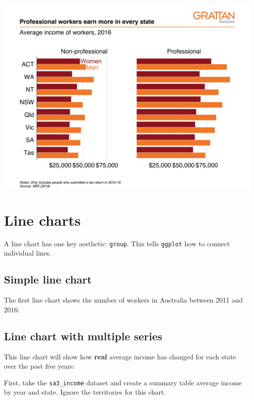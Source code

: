 \documentclass[
]{book}
\begin{document}
\includegraphics[width=44.44in]{atlas/facet_bar}

\hypertarget{line-charts}{%
\section{Line charts}\label{line-charts}}

A line chart has one key aesthetic: \texttt{group}. This tells \texttt{ggplot} how to connect individual lines.

\hypertarget{simple-line-chart}{%
\subsection{Simple line chart}\label{simple-line-chart}}

The first line chart shows the number of workers in Australia between 2011 and 2016:

\hypertarget{line-chart-with-multiple-series}{%
\subsection{Line chart with multiple series}\label{line-chart-with-multiple-series}}

This line chart will show how \textbf{real} average income has changed for each state over the past five years:

First, take the \texttt{sa3\_income} dataset and create a summary table average income by year and state. Ignore the territories for this chart.
\end{document}
